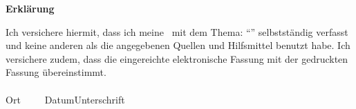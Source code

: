 

\newpage
\thispagestyle{empty}
\begin{framed}
    \begin{center}
        \Large\bfseries Erklärung
    \end{center}
    \medskip
    \noindent
    Ich versichere hiermit, dass ich meine \Was\ mit dem Thema:
    \enquote{\Titel}
    selbstständig verfasst und keine anderen als die angegebenen Quellen und Hilfsmittel benutzt habe. Ich versichere zudem, dass die eingereichte elektronische Fassung mit der gedruckten Fassung übereinstimmt.\\[3cm]
    \underline{\hspace{4cm}}\hfill\underline{\hspace{6cm}}\\
    Ort~~~~~Datum\hfill Unterschrift\hspace{4cm}
\end{framed}

\endinput
